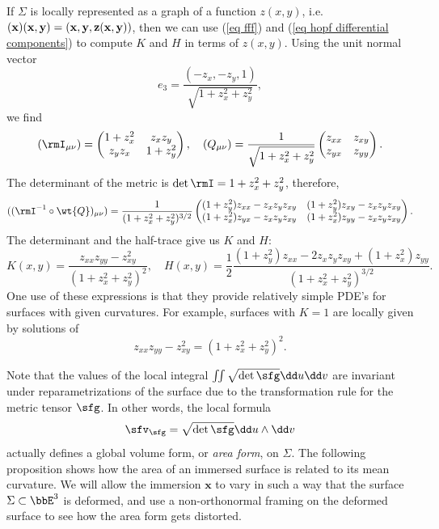 \begin{rem}
    If $\Sigma$ is locally represented as a graph of a function $z(x,y)$, i.e.\ $\bf(x)(x,y)=(x,y,z(x,y))$, then we can use (\ref{eq fff}) and (\ref{eq hopf differential components}) to compute $K$ and $H$ in terms of $z(x,y)$. Using the unit normal vector 
    \[e_3=\frac{(-z_x,-z_y,1)}{\sqrt{1+z_x^2+z_y^2}},\]
    we find
    \[(\rmI_{\mu\nu})= \begin{pmatrix}
        1+z_x^2 & z_xz_y\\
        z_y z_x & 1+z_y^2
    \end{pmatrix},\quad 
    (Q_{\mu\nu})=
    \frac{1}{\sqrt{1+z_x^2+z_y^2}}
    \begin{pmatrix}
        z_{xx} & z_{xy}\\
        z_{yx} & z_{yy}
    \end{pmatrix}.\]
    The determinant of the metric is $\det\rmI=1+z_x^2+z_y^2$, therefore,
    \[((\rmI^{-1}\circ \wt{Q})_{\mu\nu})=
    \frac{1}{(1+z_x^2+z_y^2)^{3/2}}
    \begin{pmatrix}
        (1+z_y^2)z_{xx}-z_xz_yz_{xy} & (1+z_y^2)z_{xy}-z_xz_yz_{xy}\\
        (1+z_x^2)z_{yx}-z_xz_yz_{xy} & (1+z_x^2)z_{yy}-z_xz_yz_{xy}
    \end{pmatrix}.
    \]
    The determinant and the half-trace give us $K$ and $H$:
    \[K(x,y)=\frac{z_{xx}z_{yy}-z_{xy}^2}{(1+z_x^2+z_y^2)^2},\quad 
    H(x,y)=\frac{1}{2}\frac{(1+z_y^2)z_{xx}-2z_xz_yz_{xy}+(1+z_x^2)z_{yy}}{(1+z_x^2+z_y^2)^{3/2}}.\label{eq local formulas for K and H}
    \]
    One use of these expressions is that they provide relatively simple PDE's for surfaces with given curvatures. For example, surfaces with $K=1$ are locally given by solutions of 
    \[z_{xx}z_{yy}-z_{xy}^2=(1+z_x^2+z_y^2)^2.\label{eq 1.4 Ivey}\]
\end{rem}


Note that the values of the local integral $\iint \sqrt{\det \sfg}\dd u\dd v$ are invariant under reparametrizations of the surface due to the transformation rule for the metric tensor $\sfg$. In other words, the local formula 
\[\sfv_{\sfg}=\sqrt{\det\sfg}\dd u\wedge\dd v\]
actually defines a global volume form, or \emph{area form}, on $\Sigma$. The following proposition shows how the area of an immersed surface is related to its mean curvature. We will allow the immersion $\bm{x}$ to vary in such a way that the surface $\Sigma\subset\bbE^3$ is deformed, and use a non-orthonormal framing on the deformed surface to see how the area form gets distorted.

